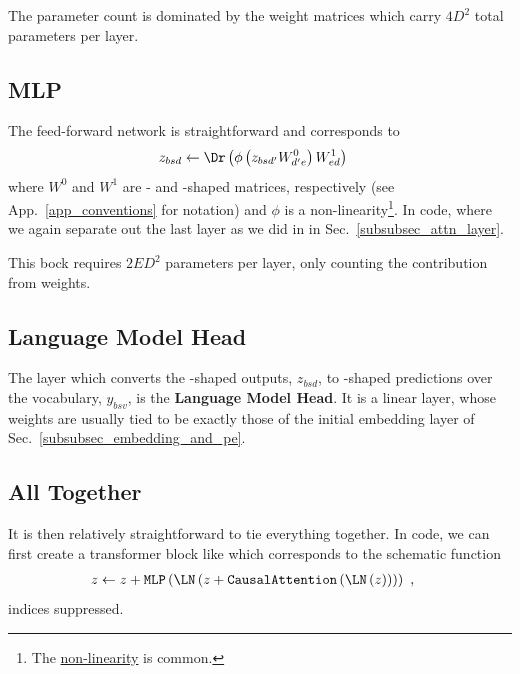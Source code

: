 \documentclass[11pt]{article}
\begin{document}
The parameter count is dominated by the weight matrices which carry $ 4 D ^{ 2 } $ total parameters per layer.


\subsection{MLP \label{subsubsec_mlp} }

The feed-forward network is straightforward and corresponds to
\begin{align}
  z _{ bsd } &\leftarrow \Dr \left (\phi \left ( z _{ bsd' }W ^{ 0 }_{ d'e } \right ) W ^{ 1 } _{ ed
      } \right ) \label{eq_mlp}
\end{align}
where $ W ^{ 0 } $ and $ W ^{ 1 } $ are - and -shaped matrices,
respectively (see App.~\ref{app_conventions} for notation) and $ \phi $ is a
non-linearity\footnote{The 
\href{https://pytorch.org/docs/stable/generated/torch.nn.GELU.html}{non-linearity} is common.}.
In code, where we again separate out the last  layer as we did in in
Sec.~\ref{subsubsec_attn_layer}.  

This bock requires $ 2 E D ^{ 2 } $ parameters per layer, only counting the contribution from
weights.


\subsection{Language Model Head \label{subsubsec_language_model_head} }


The layer which converts the -shaped outputs, $ z _{ bsd } $, to -shaped
predictions over the vocabulary, $  y _{ bsv } $, is the \textbf{Language Model Head}. It
is a linear layer, whose weights are usually tied to be exactly those of the initial embedding
layer of Sec.~\ref{subsubsec_embedding_and_pe}.


\subsection{All Together}
It is then relatively straightforward to tie everything together.  In code, we can first create a
transformer block like
which corresponds to the schematic function
\begin{align}
  z &\leftarrow  z + \texttt{MLP}\left ( \LN \left ( z + \texttt{CausalAttention}\left ( \LN \left (
  z\right ) \right )  \right ) \right )\ ,
\end{align}
indices suppressed.
\end{document}
